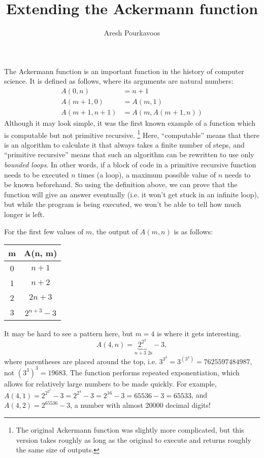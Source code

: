 \documentclass{article}
\begin{document}
\title{Extending the Ackermann function}
\author{Aresh Pourkavoos}
\maketitle

The Ackermann function is an important function
in the history of computer science.
It is defined as follows,
where its arguments are natural numbers:
\begin{align*}
  A(0, n) &= n+1 \\
  A(m+1, 0) &= A(m, 1) \\
  A(m+1, n+1) &= A(m, A(m+1, n))
\end{align*}
Although it may look simple,
it was the first known example
of a function which is computable but not primitive recursive.
\footnote{
  The original Ackermann function was slightly more complicated,
  but this version takes roughly as long as the original to execute
  and returns roughly the same size of outputs.
}
Here, ``computable'' means that there is an algorithm
to calculate it that always takes a finite number of steps,
and ``primitive recursive'' means that such an algorithm
can be rewritten to use only \textit{bounded loops}.
In other words, if a block of code in a primitive recursive function
needs to be executed $n$ times (a loop),
a maximum possible value of $n$ needs to be known beforehand.
So using the definition above,
we can prove that the function will give an answer eventually
(i.e. it won't get stuck in an infinite loop),
but while the program is being executed,
we won't be able to tell how much longer is left.

For the first few values of $m$,
the output of $A(m, n)$ is as follows:
\begin{center}
  \begin{tabular}{|c|c|}
    \hline
    m & A(n, m) \\ \hline
    0 & $n+1$ \\ \hline
    1 & $n+2$ \\ \hline
    2 & $2n+3$ \\ \hline
    3 & $2^{n+3}-3$ \\ \hline
  \end{tabular}
\end{center}
It may be hard to see a pattern here,
but $m=4$ is where it gets interesting.
\[
A(4, n) = \underbrace{2^{2^{2^{...}}}}_{n+3 \text{ 2s}}-3,
\]
where parentheses are placed around the top,
i.e. $3^{3^3}=3^{(3^3)}=7625597484987$, not $(3^3)^3=19683$.
The function performs repeated exponentiation,
which allows for relatively large numbers to be made quickly.
For example, $A(4, 1)=2^{2^{2^2}}-3=2^{2^4}-3=2^{16}-3=65536-3=65533$,
and $A(4, 2)=2^{65536}-3$,
a number with almost 20000 decimal digits!
\end{document}
